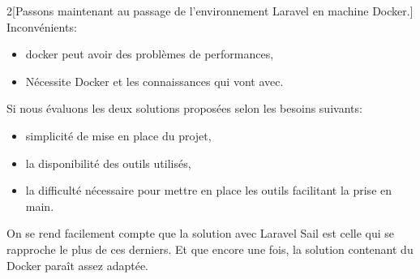 \documentclass[
    iai, %
    il, %
]{heig-tb}
\begin{document}
\begin{multicols}{2}[Passons maintenant au passage de l'environnement Laravel en machine Docker.]
    Inconvénients:
    \begin{itemize}
        \item \Gls{docker} peut avoir des problèmes de performances, \cite{labrecque}
        \item Nécessite Docker et les connaissances qui vont avec. \cite{labrecque}
    \end{itemize}
\end{multicols}

Si nous évaluons les deux solutions proposées selon les besoins suivants:
\begin{itemize}
    \item simplicité de mise en place du projet,
    \item la disponibilité des outils utilisés,
    \item la difficulté nécessaire pour mettre en place les outils facilitant la prise en main.
\end{itemize}

On se rend facilement compte que la solution avec Laravel Sail est celle qui se rapproche le plus de ces derniers. Et que encore une fois, la solution contenant du Docker paraît assez adaptée.

\end{document}
